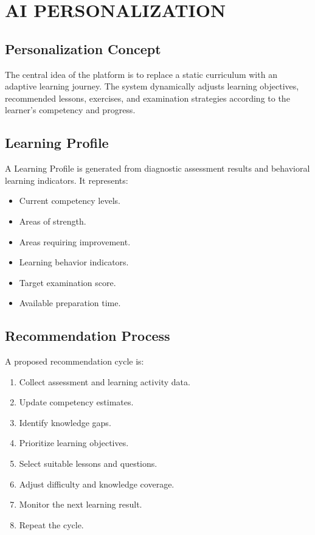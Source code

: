 \documentclass[12pt,a4paper]{report}
\begin{document}
\chapter{AI PERSONALIZATION}

\section{Personalization Concept}

The central idea of the platform is to replace a static curriculum with an adaptive learning journey. The system dynamically adjusts learning objectives, recommended lessons, exercises, and examination strategies according to the learner's competency and progress.

\section{Learning Profile}

A Learning Profile is generated from diagnostic assessment results and behavioral learning indicators. It represents:

\begin{itemize}
    \item Current competency levels.
    \item Areas of strength.
    \item Areas requiring improvement.
    \item Learning behavior indicators.
    \item Target examination score.
    \item Available preparation time.
\end{itemize}

\section{Recommendation Process}

A proposed recommendation cycle is:

\begin{enumerate}
    \item Collect assessment and learning activity data.
    \item Update competency estimates.
    \item Identify knowledge gaps.
    \item Prioritize learning objectives.
    \item Select suitable lessons and questions.
    \item Adjust difficulty and knowledge coverage.
    \item Monitor the next learning result.
    \item Repeat the cycle.
\end{enumerate}
\end{document}
